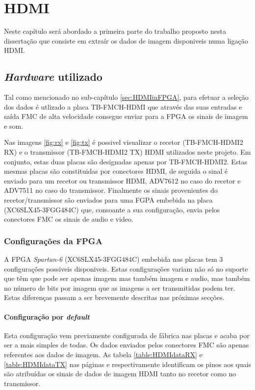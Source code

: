 \chapter{HDMI}\label{chap:chap3}

Neste capítulo será abordado a primeira parte do trabalho proposto nesta dissertação que consiste em extraír os dados de imagem disponiveis numa ligação HDMI.

\section{\textit{Hardware} utilizado}

Tal como mencionado no sub-capítulo \ref{sec:HDMIinFPGA}, para efetuar a seleção dos dados é utlizado a placa TB-FMCH-HDMI que através das suas entradas e saída FMC de alta velocidade consegue enviar para a FPGA os sinais de imagem e som. 

Nas imagens \ref{fig:rx} e \ref{fig:tx} é possivel visualizar o recetor (TB-FMCH-HDMI2 RX) e o transmissor (TB-FMCH-HDMI2 TX) HDMI utilizados neste projeto. Em conjunto, estas duas placas são designadas apenas por TB-FMCH-HDMI2. Estas mesmas placas são constituidas por conectores HDMI, de seguida o sinal é enviado para um recetor ou transmissor HDMI, ADV7612 no caso do recetor e ADV7511 no caso do transmissor. Finalmente os sinais provenientes do recetor/transmissor são enviados para uma FGPA embebida na placa (XC6SLX45-3FGG484C) que, consoante a sua configuração, envia pelos conectores FMC os sinais de audio e video.

\subsection{Configurações da FPGA} \label{subsec:HDMIconfig}

A FPGA \textit{Spartan-6} (XC6SLX45-3FGG484C) embebida nas placas tem 3 configurações possiveis disponiveis. Estas configurações variam não só no suporte que têm que pode ser apenas imagem mas também imagem e audio, mas também no número de bits por imagem que as imagens a ser transmitidas podem ter. Estas diferenças passam a ser brevemente descritas nas próximas secções.

\subsubsection{Configuração por \textit{default}} \label{subsubsec:HDMIconfigdefault}

Esta configuração vem previamente configurada de fábrica nas placas e acaba por ser a mais simples de todas. Os dados enviados pelos conectores FMC são apenas referentes aos dados de imagem. As tabela \ref{table:HDMIdataRX} e \ref{table:HDMIdataTX} nas páginas \pageref{table:HDMIdataRX} e \pageref{table:HDMIdataTX} respectivamente identificam os pinos aos quais são atribuídas os sinais de dados de imagem HDMI tanto no recetor como no transmissor.

